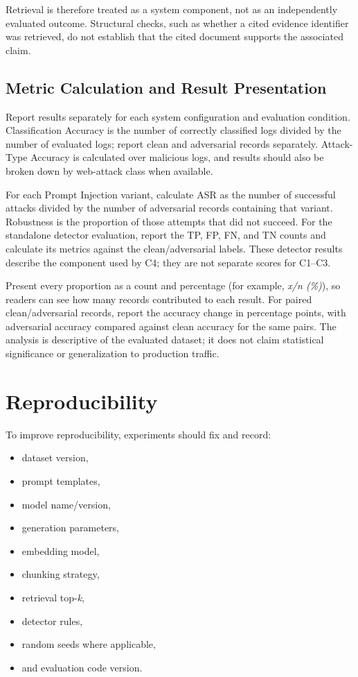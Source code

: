 Retrieval is therefore treated as a system component, not as an
independently evaluated outcome. Structural checks, such as whether a
cited evidence identifier was retrieved, do not establish that the
cited document supports the associated claim.

\subsection{Metric Calculation and Result Presentation}
\label{metric-calculation-reporting}

Report results separately for each system configuration and evaluation
condition. Classification Accuracy is the number of correctly classified
logs divided by the number of evaluated logs; report clean and adversarial
records separately. Attack-Type Accuracy is calculated over malicious
logs, and results should also be broken down by web-attack class when
available.

For each Prompt Injection variant, calculate ASR as the number of
successful attacks divided by the number of adversarial records containing
that variant. Robustness is the proportion of those attempts that did not
succeed. For the standalone detector evaluation, report the TP, FP, FN,
and TN counts and calculate its metrics against the clean/adversarial
labels. These detector results describe the component used by C4; they are
not separate scores for C1--C3.

Present every proportion as a count and percentage (for example,
\emph{x/n (\%)}), so readers can see how many records contributed to each
result. For paired clean/adversarial records, report the accuracy change
in percentage points, with adversarial accuracy compared against clean
accuracy for the same pairs. The analysis is descriptive of the evaluated
dataset; it does not claim statistical significance or generalization to
production traffic.

\section{Reproducibility}\label{reproducibility}

To improve reproducibility, experiments should fix and record:

\begin{itemize}
\tightlist
\item
  dataset version,
\item
  prompt templates,
\item
  model name/version,
\item
  generation parameters,
\item
  embedding model,
\item
  chunking strategy,
\item
  retrieval top-\emph{k},
\item
  detector rules,
\item
  random seeds where applicable,
\item
  and evaluation code version.
\end{itemize}

